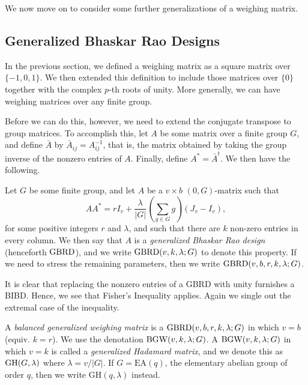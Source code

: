 \documentclass[../../../main]{subfiles}
\begin{document}
We now move on to consider some further generalizations of a weighing matrix.

\dinkus


\subsection{Generalized Bhaskar Rao Designs}

In the previous section, we defined a weighing matrix as a square matrix over $\{-1,0,1\}$. We then extended this definition to include those matrices over $\{0\}$ together with the complex $p$-th roots of unity. More generally, we can have weighing matrices over any finite group. 

Before we can do this, however, we need to extend the conjugate transpose to group matrices. To accomplish this, let $A$ be some matrix over a finite group $G$, and define $\bar A$ by $\bar{A}_{ij}=A_{ij}^{-1}$, that is, the matrix obtained by taking the group inverse of the nonzero entries of $A$. Finally, define $A^* = \bar{A}^t$. We then have the following.

\begin{defin}\label{gbrd definition}
  Let $G$ be some finite group, and let $A$ be a $v \times b$ $(0,G)$-matrix such that
  \begin{equation}\label{gbrd-eq}
    AA^* = rI_v + \frac{\lambda}{|G|}\left(\sum_{g \in G}g\right)(J_v - I_v),
  \end{equation}
  for some positive integers $r$ and $\lambda$, and such that there are $k$ non-zero entries in every column. We then say that $A$ is a {\it generalized Bhaskar Rao design} (henceforth $\text{GBRD}$), and we write $\text{GBRD}(v,k,\lambda;G)$ to denote this property. If we need to stress the remaining parameters, then we write $\text{GBRD}(v,b,r,k,\lambda;G)$.
\end{defin}

It is clear that replacing the nonzero entries of a GBRD with unity furnishes a
BIBD. Hence, we see that Fisher's Inequality applies. Again we single out the
extremal case of the inequality.

\begin{defin}\label{bgw definition}
  A {\it balanced generalized weighing matrix} is a $\text{GBRD}(v,b,r,k,\lambda;G)$
  in which $v = b$ (equiv. $k = r$). We use the denotation
  $\text{BGW}(v,k,\lambda;G)$. A $\text{BGW}(v,k,\lambda;G)$ in which $v = k$ is called a
  {\it generalized Hadamard matrix}, and we denote this as $\text{GH}(G,\lambda)$
  where $\lambda = v/|G|$. If $G = \mathrm{EA}(q)$, the elementary abelian group
   of order $q$, then we write $\mathrm{GH}(q,\lambda)$ instead.
\end{defin}
\end{document}
